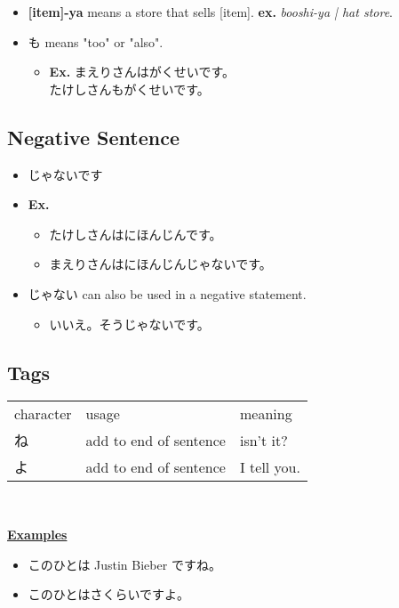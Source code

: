 \documentclass{article}
\begin{document}
\begin{CJK}{UTF8}{min}
\begin{itemize}
\item {\bf [item]-ya} means a store that sells [item]. {\bf ex.} {\it booshi-ya | hat store}.
\item も means "too" or "also".
\begin{itemize}
\item {\bf Ex.} まえりさんはがくせいです。\\
		たけしさんもがくせいです。
\end{itemize}
\end{itemize}

\subsection{Negative Sentence}

\begin{itemize}
\item じゃないです
\item {\bf Ex.}
\begin{itemize}
\item たけしさんはにほんじんです。
\item まえりさんはにほんじんじゃないです。
\end{itemize}
\item じゃない can also be used in a negative statement.
\begin{itemize}
\item いいえ。そうじゃないです。
\end{itemize}
\end{itemize}

\subsection{Tags}

\begin{tabular}{ l | l | l }
character & usage & meaning\\
ね& add to end of sentence & isn't it?\\
よ & add to end of sentence & I tell you.\\
\end{tabular}\\

\bigskip

\underline{\bf Examples}
\begin{itemize}
\item このひとは Justin Bieber ですね。
\item このひとはさくらいですよ。
\end{itemize}






\end{CJK}
\end{document}

